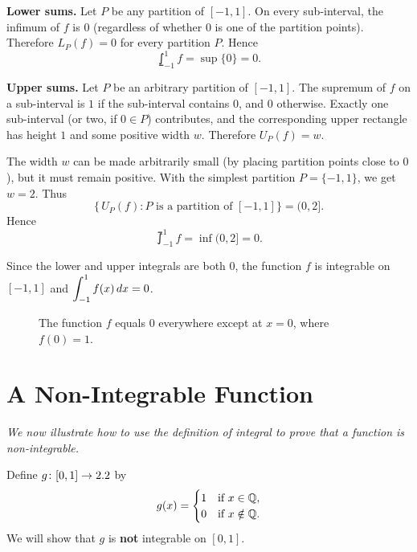 \textbf{Lower sums.}  Let $P$ be any partition of $[-1,1]$.  On every sub-interval, the infimum of $f$ is $0$ (regardless of whether $0$ is one of the partition points).  Therefore $L_P(f) = 0$ for every partition $P$.  Hence
\[
  \lowint_{-1}^{1} f = \sup\{0\} = 0.
\]

\textbf{Upper sums.}  Let $P$ be an arbitrary partition of $[-1,1]$.  The supremum of $f$ on a sub-interval is $1$ if the sub-interval contains $0$, and $0$ otherwise.  Exactly one sub-interval (or two, if $0 \in P$) contributes, and the corresponding upper rectangle has height $1$ and some positive width $w$.  Therefore $U_P(f) = w$.

The width $w$ can be made arbitrarily small (by placing partition points close to $0$), but it must remain positive.  With the simplest partition $P = \{-1,1\}$, we get $w = 2$.  Thus
\[
  \bigl\{\, U_P(f) : P \text{ is a partition of } [-1,1] \bigr\} = (0, 2].
\]
Hence
\[
  \upint_{-1}^{1} f = \inf(0,2] = 0.
\]

Since the lower and upper integrals are both $0$, the function $f$ is integrable on $[-1,1]$ and $\displaystyle\int_{-1}^{1} f(x)\,dx = 0$.

\begin{figure}[ht]
  \centering
  
  \caption{The function $f$ equals $0$ everywhere except at $x=0$, where $f(0)=1$.}
  \label{fig:single-point-spike}
\end{figure}

\section{A Non-Integrable Function}
\label{sec:7.8}

\textit{We now illustrate how to use the definition of integral to prove that a function is non-integrable.}

\begin{example}
\label{ex:7-10}
Define $g \colon [0,1] \to 2.2$ by
\[
  g(x) = \begin{cases} 1 & \text{if } x \in \mathbb{Q}, \\ 0 & \text{if } x \notin \mathbb{Q}. \end{cases}
\]
We will show that $g$ is \textbf{not} integrable on $[0,1]$.
\end{example}

